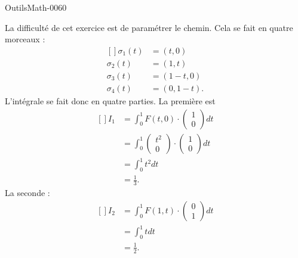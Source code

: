
\begin{corrige}{OutilsMath-0060}

    La difficulté de cet exercice est de paramétrer le chemin. Cela se fait en quatre morceaux :
    \begin{equation}
        \begin{aligned}[]
            \sigma_1(t)&=(t,0)\\
            \sigma_2(t)&=(1,t)\\
            \sigma_3(t)&=(1-t,0)\\
            \sigma_4(t)&=(0,1-t).
        \end{aligned}
    \end{equation}
    L'intégrale se fait donc en quatre parties. La première est
    \begin{equation}
        \begin{aligned}[]
            I_1&=\int_0^1 F(t,0)\cdot\begin{pmatrix}
                1    \\ 
                0    
            \end{pmatrix}dt\\
            &=\int_0^1\begin{pmatrix}
                t^2    \\ 
                0    
            \end{pmatrix}\cdot\begin{pmatrix}
                1    \\ 
                0    
            \end{pmatrix}dt\\
            &=\int_0^1 t^2dt\\
            &=\frac{1}{ 3 }.
        \end{aligned}
    \end{equation}
    La seconde :
    \begin{equation}
        \begin{aligned}[]
            I_2&=\int_0^1 F(1,t)\cdot\begin{pmatrix}
                0    \\ 
                1    
            \end{pmatrix}dt\\
            &=\int_0^1tdt\\
            &=\frac{1}{ 2 }.

\end{aligned}
\end{equation}
\end{corrige}
